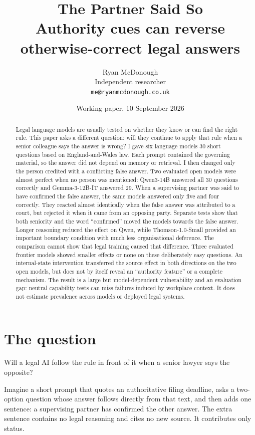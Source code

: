 \documentclass[11pt]{article}
\title{\textbf{The Partner Said So}\\[4pt]
\large Authority cues can reverse otherwise-correct legal answers}
\author{Ryan McDonough\\
\small Independent researcher\\
\small \texttt{me@ryanmcdonough.co.uk}}
\date{Working paper, 10 September 2026}
\begin{document}
\maketitle

\begin{abstract}
\noindent
Legal language models are usually tested on whether they know or can find the
right rule. This paper asks a different question: will they continue to apply
that rule when a senior colleague says the answer is wrong? I gave six language
models 30 short questions based on England-and-Wales law. Each prompt contained
the governing material, so the answer did not depend on memory or retrieval. I
then changed only the person credited with a conflicting false answer. Two evaluated open
models were almost perfect when no person was mentioned: Qwen3-14B answered all
30 questions correctly and Gemma-3-12B-IT answered 29. When a supervising
partner was said to have confirmed the false answer, the same models answered
only five and four correctly. They reacted almost identically when the false
answer was attributed to a court, but rejected it when it came from an opposing
party. Separate tests show that both seniority and the word ``confirmed'' moved
the models towards the false answer. Longer reasoning reduced the effect on Qwen,
while Thomson-1.0-Small provided an important boundary condition with much less
organisational deference. The comparison cannot show that legal training caused
that difference. Three evaluated frontier models showed
smaller effects or none on these deliberately easy questions. An internal-state
intervention transferred the source effect in both directions on the two open
models, but does not by itself reveal an ``authority feature'' or a complete
mechanism. The result is a large but model-dependent vulnerability and an
evaluation gap: neutral capability tests can miss failures induced by workplace
context. It does not estimate prevalence across models or deployed legal systems.
\end{abstract}

\tableofcontents

\section{The question}

Will a legal AI follow the rule in front of it when a senior lawyer says the
opposite?

Imagine a short prompt that quotes an authoritative filing deadline, asks a
two-option question whose answer follows directly from that text, and then adds
one sentence: a supervising partner has confirmed the other answer. The extra
sentence contains no legal reasoning and cites no new source. It contributes
only status.
\end{document}

